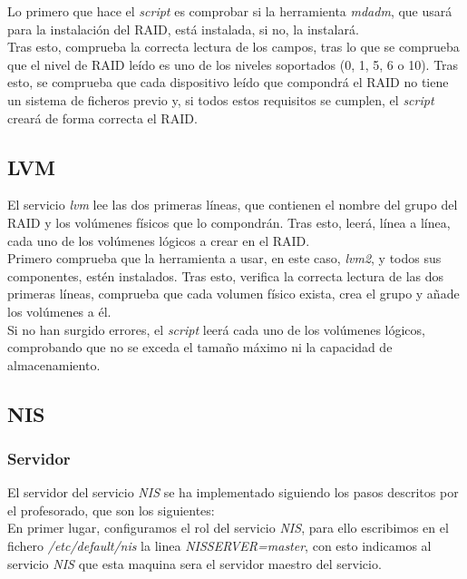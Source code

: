 \documentclass[12pt,a4paper, spanish]{article}
\begin{document}
Lo primero que hace el \textit{script} es comprobar si la herramienta \textit{mdadm}, que usará para la instalación del RAID, está instalada, si no, la instalará.\\

Tras esto, comprueba la correcta lectura de los campos, tras lo que se comprueba que el nivel de RAID leído es uno de los niveles soportados (0, 1, 5, 6 o 10). Tras esto, se comprueba que cada dispositivo leído que compondrá el RAID no tiene un sistema de ficheros previo y, si todos estos requisitos se cumplen, el \textit{script} creará de forma correcta el RAID.\\


\newpage
\subsection{LVM}
\noindent El servicio \textit{lvm} lee las dos primeras líneas, que contienen el nombre del grupo del RAID y los volúmenes físicos que lo compondrán. Tras esto, leerá, línea a línea, cada uno de los volúmenes lógicos a crear en el RAID.\\

Primero comprueba que la herramienta a usar, en este caso, \textit{lvm2}, y todos sus componentes, estén instalados. Tras esto, verifica la correcta lectura de las dos primeras líneas, comprueba que cada volumen físico exista, crea el grupo y añade los volúmenes a él.\\

Si no han surgido errores, el \textit{script} leerá cada uno de los volúmenes lógicos, comprobando que no se exceda el tamaño máximo ni la capacidad de almacenamiento.


\subsection{NIS}
\subsubsection{Servidor}
\noindent El servidor del servicio \textit{NIS} se ha implementado siguiendo los pasos descritos por el profesorado, que son los siguientes:\\

En primer lugar, configuramos el rol del servicio \textit{NIS}, para ello escribimos en el fichero \textit{/etc/default/nis} la linea \textit{NISSERVER=master}, con esto indicamos al servicio \textit{NIS} que esta maquina sera el servidor maestro del servicio.\\
\end{document}
